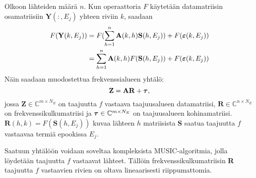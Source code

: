 Olkoon lähteiden määrä $n$. Kun operaattoria $F$ käytetään datamatriisin osamatriisiin $\mathbf{Y}(:,E_j)$ yhteen riviin $k$, saadaan
\begin{equation}
    \begin{split}
    F(\mathbf{Y}(k,E_j))& = F(\sum_{h=1}^n\mathbf{A}(k,h)\mathbf{S}(h,E_j))+F(\text{\boldmath$\varepsilon$}(k,E_j))\\
    & = \sum_{h=1}^n\mathbf{A}(k,h)F(\mathbf{S}(h,E_j))+F(\text{\boldmath$\varepsilon$}(k,E_j))
    \end{split}
\end{equation}
Näin saadaan muodostettua frekvenssialueen yhtälö:
\begin{equation}
    \mathbf{Z = AR+\text{\boldmath$\tau$}},
\end{equation}
jossa $\mathbf{Z}\in \mathbb{C}^{m\times N_E}$ on taajuutta $f$ vastaava taajuusalueen datamatriisi, $\mathbf{R}\in \mathbb{C}^{n\times N_E}$ on frekvenssikulkumatriisi ja $\text{\boldmath$\tau$}\in \mathbb{C}^{m\times N_E}$ on taajuusalueen kohinamatriisi. $\mathbf{R}(h,k) = F(\mathbf{S}(h,E_j))$ kuvaa lähteen $h$ matriisista \textbf{S} saatua taajuutta $f$ vastaavaa termiä epookissa $E_j$.

Saatuun yhtälöön voidaan soveltaa kompleksista MUSIC-algoritmia, jolla löydetään taajuutta $f$ vastaavat lähteet. Tällöin frekvenssikulkumatriisin \textbf{R} taajuutta $f$ vastaavien rivien on oltava lineaarisesti riippumattomia.